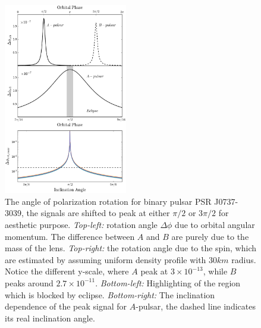\documentclass[aps,showpacs,twocolumn,floats,prd,superscriptaddress,nofootinbib]{revtex4}
\begin{document}
\begin{figure}
\includegraphics[width=0.48\textwidth]{rotang.eps}
\caption{\label{fig:rotang}
The angle of polarization rotation for binary pulsar PSR J0737-3039, the signals are shifted to peak at either $\pi/2$ 
or  $3\pi/2$ for aesthetic purpose. {\it Top-left:} rotation angle $\Delta \phi$ due to orbital angular momentum. 
The difference between $A$ and $B$ are purely due to the mass of the lens. {\it Top-right:} the rotation angle due 
to the spin, which are estimated by assuming uniform density profile with $30 km$ radius.  Notice the different 
y-scale, where $A$ peak at $3\times 10^{-13}$, while $B$ peaks around $2.7\times 10^{-11}$. 
{\it Bottom-left:} Highlighting of the region which is blocked by eclipse. 
{\it Bottom-right:}  The inclination dependence of the peak signal for $A$-pulsar, the dashed line indicates its
real inclination angle.
 }
\end{figure}
\end{document}
